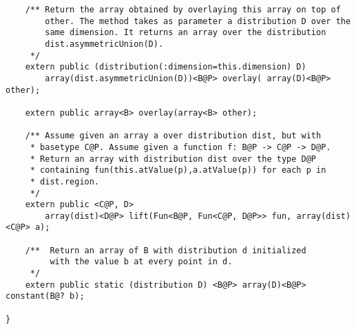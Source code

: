 \documentclass[fullpage]{article}
\begin{document}
{\begin{verbatim}
    /** Return the array obtained by overlaying this array on top of
        other. The method takes as parameter a distribution D over the
        same dimension. It returns an array over the distribution
        dist.asymmetricUnion(D).
     */
    extern public (distribution(:dimension=this.dimension) D)  
        array(dist.asymmetricUnion(D))<B@P> overlay( array(D)<B@P> other);

    extern public array<B> overlay(array<B> other);

    /** Assume given an array a over distribution dist, but with
     * basetype C@P. Assume given a function f: B@P -> C@P -> D@P.
     * Return an array with distribution dist over the type D@P
     * containing fun(this.atValue(p),a.atValue(p)) for each p in
     * dist.region.
     */
    extern public <C@P, D> 
        array(dist)<D@P> lift(Fun<B@P, Fun<C@P, D@P>> fun, array(dist)<C@P> a);

    /**  Return an array of B with distribution d initialized
         with the value b at every point in d.
     */
    extern public static (distribution D) <B@P> array(D)<B@P> constant(B@? b);

}
\end{verbatim}}
\end{document}
